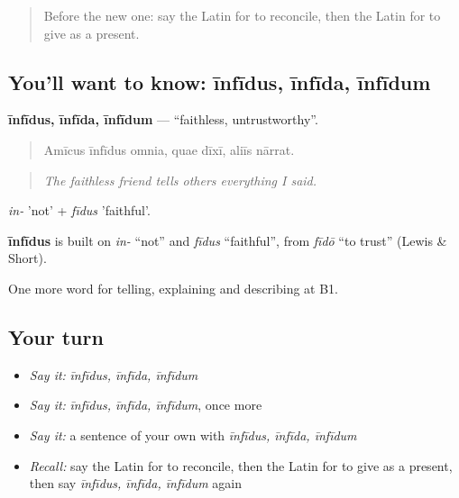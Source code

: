 \label{lesson:LA-C537-infidus}



\begin{quote}
Before the new one: say the Latin for to reconcile, then the Latin for to give as a present.
\end{quote}

\subsection*{You'll want to know: īnfīdus, īnfīda, īnfīdum}
\textbf{īnfīdus, īnfīda, īnfīdum} — \textquotedblleft{}faithless, untrustworthy\textquotedblright{}.

\begin{quote}
Amīcus īnfīdus omnia, quae dīxī, aliīs nārrat.
\end{quote}

\begin{quote}
\emph{The faithless friend tells others everything I said.}
\end{quote}

\emph{in-} 'not' + \emph{fīdus} 'faithful'.

\begin{cousinweb}
\textbf{īnfīdus} is built on \emph{in-} \textquotedblleft{}not\textquotedblright{} and \emph{fīdus} \textquotedblleft{}faithful\textquotedblright{}, from \emph{fīdō} \textquotedblleft{}to trust\textquotedblright{} (Lewis \& Short).
\end{cousinweb}

\begin{grammarlens}[title={What you've built}]
One more word for telling, explaining and describing at B1.
\end{grammarlens}

\subsection*{Your turn}
\begin{itemize}
\raggedright
  \item \emph{Say it:} \emph{īnfīdus, īnfīda, īnfīdum}
  \item \emph{Say it:} \emph{īnfīdus, īnfīda, īnfīdum}, once more
  \item \emph{Say it:} a sentence of your own with \emph{īnfīdus, īnfīda, īnfīdum}
  \item \emph{Recall:} say the Latin for to reconcile, then the Latin for to give as a present, then say \emph{īnfīdus, īnfīda, īnfīdum} again
\end{itemize}

